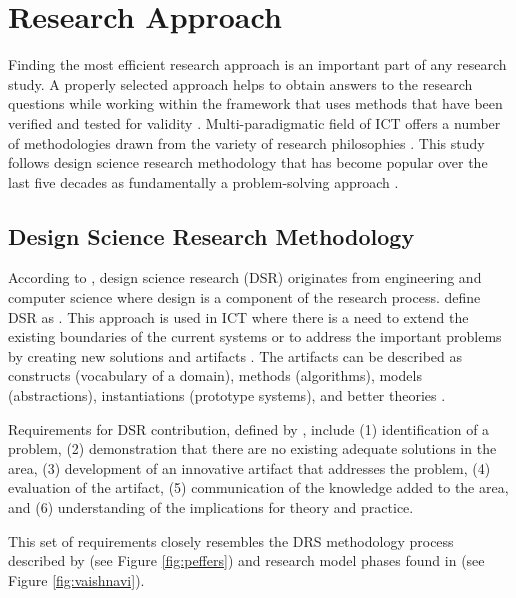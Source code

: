 \section{Research Approach}
\label{sec:method}

Finding the most efficient research approach is an important part of any
research study. A properly selected approach helps to obtain answers to the
research questions while working within the framework that uses methods that
have been verified and tested for validity \citep{Kumar2005}. Multi-paradigmatic
field of ICT offers a number of methodologies drawn from the variety of research
philosophies \citep{Vaishnavi2007}. This study follows design science research
methodology that has become popular over the last five decades as fundamentally
a problem-solving approach \citep{Cross1993}.

\subsection{Design Science Research Methodology}

According to \citet{Peffers2008}, design science research (DSR) originates from
engineering and computer science where design is a component of the research
process. \citet[p.~4]{Iivari2009} define DSR as . This approach is used in ICT where there is a need to
extend the existing boundaries of the current systems or to address the important problems
by creating new solutions and artifacts \citep{Hevner2004}. The artifacts can be
described as constructs (vocabulary of a domain), methods (algorithms), models
(abstractions), instantiations (prototype systems), and better theories
\citep{Hevner2010}.

Requirements for DSR contribution, defined by \citet{March2008}, include (1)
identification of a problem, (2) demonstration that there are no existing
adequate solutions in the area, (3) development of an innovative artifact that
addresses the problem, (4) evaluation of the artifact, (5) communication of the
knowledge added to the area, and (6) understanding of the implications for
theory and practice.

This set of requirements closely resembles the DRS methodology process described
by \citet{Peffers2008} (see Figure \ref{fig:peffers}) and research model phases
found in \citet{Vaishnavi2007} (see Figure \ref{fig:vaishnavi}).

